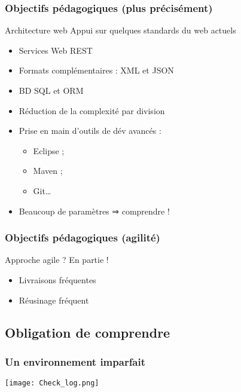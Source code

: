 \documentclass[english, french]{beamer}
\begin{document}
\begin{frame}
	\frametitle{Objectifs pédagogiques (plus précisément)}
	\begin{block}{Architecture web}
		Appui sur quelques standards du web actuels
		\begin{itemize}
			\item Services Web REST
			\item Formats complémentaires : XML et JSON
			\item BD SQL et ORM
			\item Réduction de la complexité par division
		\end{itemize}
	\end{block}
	\begin{itemize}
		\item Prise en main d’outils de dév avancés : 
		\begin{itemize}
			\item Eclipse ;
			\item Maven ;
			\item Git…
		\end{itemize}
		\item Beaucoup de paramètres ⇒ comprendre !
	\end{itemize}
\end{frame}

\begin{frame}
	\frametitle{Objectifs pédagogiques (agilité)}
	Approche agile ? En partie !
	\begin{itemize}
		\item Livraisons fréquentes
		\item Réusinage fréquent
	\end{itemize}
\end{frame}

\subsection{Obligation de comprendre}
\begin{frame}[fragile]
	\frametitle{Un environnement imparfait}
	\begin{minipage}{\columnwidth+15mm}
	\hspace{-8mm}%
	\texttt{[image: Check\_log.png]}%
	\end{minipage}
\end{frame}
\end{document}

